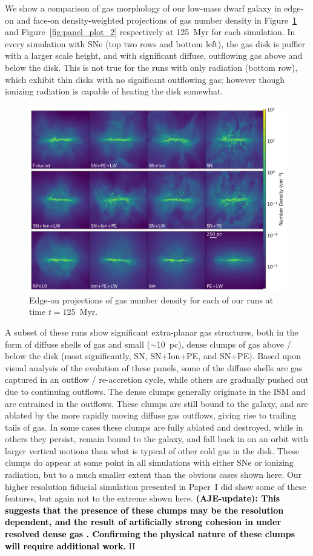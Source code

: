 \documentclass[twocolumn]{aastex62}
\newcommand{\changed}[1]{\textcolor{black}{\textbf{(AJE-update): #1}}}
\begin{document}
We show a comparison of gas morphology of our low-mass dwarf galaxy in edge-on and face-on density-weighted projections of gas number density in Figure~\ref{fig:panel_plot_1} and Figure~\ref{fig:panel_plot_2} respectively at 125~Myr for each simulation. In every simulation with SNe (top two rows and bottom left), the gas disk is puffier with a larger scale height, and with significant diffuse, outflowing gas above and below the disk. This is not true for the runs with only radiation (bottom row), which exhibit thin disks with no significant outflowing gas; however though ionizing radiation is capable of heating the disk somewhat. 

\begin{figure}
  \centering
  \includegraphics[width=0.95\linewidth]{figures/proj_plot_n_x_125.png}
  \caption{Edge-on projections of gas number density for each of our runs at time $t=125$~Myr.}
  \label{fig:panel_plot_1}
\end{figure}

A subset of these runs show significant extra-planar gas structures, both in the form of diffuse shells of gas and small ($\sim$10~pc), dense clumps of gas above / below the disk (most significantly, SN, SN+Ion+PE, and SN+PE). Based upon visual analysis of the evolution of these panels, some of the diffuse shells are gas captured in an outflow / re-accretion cycle, while others are gradually pushed out due to continuing outflows. The dense clumps generally originate in the ISM and are entrained in the outflows. These clumps are still bound to the galaxy, and are ablated by the more rapidly moving diffuse gas outflows, giving rise to trailing tails of gas. In some cases these clumps are fully ablated and destroyed, while in others they persist, remain bound to the galaxy, and fall back in on an orbit with larger vertical motions than what is typical of other cold gas in the disk. These clumps do appear at some point in all simulations with either SNe or ionizing radiation, but to a much smaller extent than the obvious cases shown here. Our higher resolution fiducial simulation presented in Paper~I did show some of these features, but again not to the extreme shown here. \changed{This suggests that the presence of these clumps may be the resolution dependent, and the result of artificially strong cohesion in under resolved dense gas \citep{MacLowZahnle1994}. Confirming the physical nature of these clumps will require additional work.} H
\end{document}
